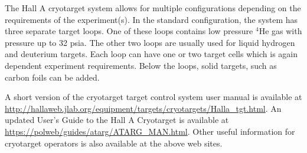 

The Hall A cryotarget system allows for multiple configurations depending
on the requirements of the experiment(s). In the standard configuration,
the system has three separate target loops. One of these loops contains
low pressure $^{4}$He gas with pressure up to 32 psia. The other
two loops are usually used for liquid hydrogen and deuterium targets.
Each loop can have one or two target cells which is again dependent
experiment requirements.   Below the loops, solid targets, such as carbon foils
can be added.   

A short version of the cryotarget target control system user manual
is available at \url{http://hallaweb.jlab.org/equipment/targets/cryotargets/Halla\_tgt.html}.
An updated User's Guide to the Hall A Cryotarget is available at \url{https://polweb/guides/atarg/ATARG\_MAN.html}.
Other useful information for cryotarget operators is also available
at the above web sites.

